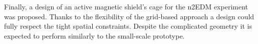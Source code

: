 Finally, a design of an active magnetic shield's cage for the n2EDM experiment was proposed. Thanks to the flexibility of the grid-based approach a design could fully respect the tight spatial constraints. Despite the complicated geometry it is expected to perform similarly to the small-scale prototype.




















